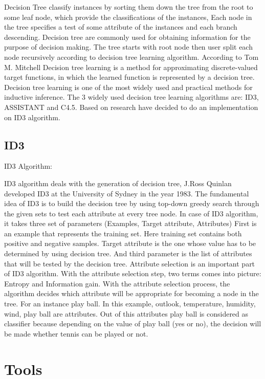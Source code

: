 \documentclass{article}
\begin{document}
Decision Tree classify instances by sorting them down the tree from the root to some leaf node, which provide the classifications of the instances, Each node in the tree specifies a test of some attribute of the instances and each branch descending.
Decision tree are commonly used for obtaining information for the purpose of decision making. The tree starts with root node then user split each node recursively according to decision tree learning algorithm.
According to Tom M. Mitchell Decision tree learning is a method for approximating discrete-valued target functions, in which the learned function is represented by a decision tree. Decision tree learning is one of the most widely used and practical methods for inductive inference. The 3 widely used decision tree learning algorithms are: ID3, ASSISTANT and C4.5. Based on research have decided to do an implementation on ID3 algorithm.


\subsection{ID3}
\label{sec:ID3}

ID3 Algorithm:

ID3 algorithm deals with the generation of decision tree, J.Ross Quinlan developed ID3 at the University of Sydney in the year 1983. The fundamental idea of ID3 is to build the decision tree by using top-down greedy search through the given sets to test each attribute at every tree node.
In case of ID3 algorithm, it takes three set of parameters
(Examples, Target attribute, Attributes)
First is an example that represents the training set. Here training set contains both positive and negative samples. Target attribute is the one whose value has to be determined by using decision tree. And third parameter is the list of attributes that will be tested by the decision tree. Attribute selection is an important part of ID3 algorithm. With the attribute selection step, two terms comes into picture: Entropy and Information gain. With the attribute selection process, the algorithm decides which attribute will be appropriate for becoming a node in the tree.
For an instance play ball. In this example, outlook, temperature, humidity, wind, play ball are attributes. Out of this attributes play ball is considered as classifier because depending on the value of play ball (yes or no), the decision will be made whether tennis can be played or not.


\section{Tools}
\label{sec:Tools}
\end{document}
